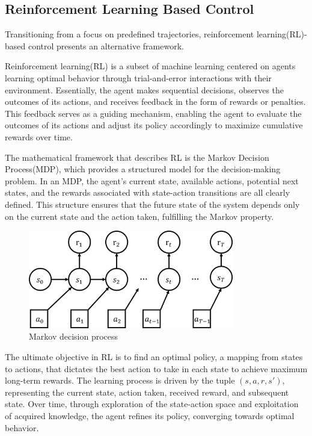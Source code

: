 \subsection{Reinforcement Learning Based Control}
Transitioning from a focus on predefined trajectories, reinforcement learning(RL)-based control presents an alternative framework.

Reinforcement learning(RL)\cite{sutton2018reinforcement} is a subset of machine learning centered on agents learning optimal behavior through trial-and-error interactions with their environment. Essentially, the agent makes sequential decisions, observes the outcomes of its actions, and receives feedback in the form of rewards or penalties. This feedback serves as a guiding mechanism, enabling the agent to evaluate the outcomes of its actions and adjust its policy accordingly to maximize cumulative rewards over time.

The mathematical framework that describes RL is the Markov Decision Process(MDP)\cite{puterman1990markov}, which provides a structured model for the decision-making problem. In an MDP, the agent's current state, available actions, potential next states, and the rewards associated with state-action transitions are all clearly defined. This structure ensures that the future state of the system depends only on the current state and the action taken, fulfilling the Markov property.

\begin{figure}[h]
    \centering
    \includegraphics[width=0.8\textwidth]{figures/MDP.png}
    \caption{Markov decision process}
    \label{fig:mdp}
\end{figure}

The ultimate objective in RL is to find an optimal policy, a mapping from states to actions, that dictates the best action to take in each state to achieve maximum long-term rewards. The learning process is driven by the tuple \((s,a,r,s')\), representing the current state, action taken, received reward, and subsequent state. Over time, through exploration of the state-action space and exploitation of acquired knowledge, the agent refines its policy, converging towards optimal behavior.

